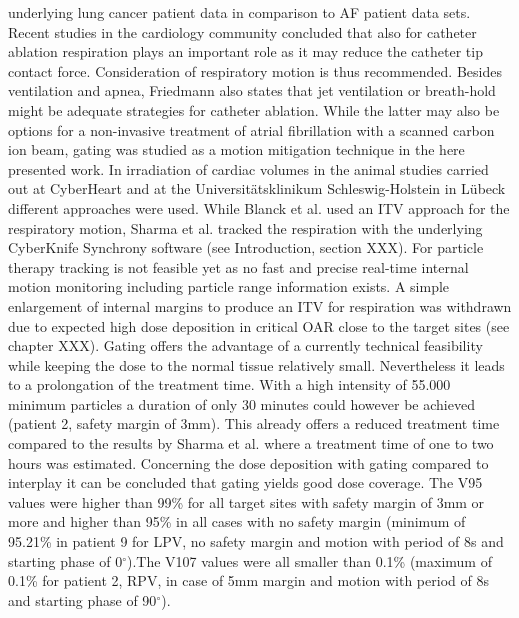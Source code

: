 \documentclass[type=dr, dr=rernat, accentcolor=tud7b,colorbacktitle, bigchapter, openright, twoside, 12pt ]{tudthesis}
\begin{document}
underlying lung cancer patient data in comparison to AF patient data sets.\newline
\newline
Recent studies in the cardiology community \cite{Kum12} concluded that also for catheter ablation respiration plays an important role as it may 
reduce the catheter tip contact force. Consideration of respiratory motion is thus recommended. Besides ventilation and apnea, Friedmann 
\cite{Frie12} also states that jet ventilation or breath-hold might be adequate strategies for catheter ablation. While the latter may also 
be options for a non-invasive treatment of atrial fibrillation with a scanned carbon ion beam, gating was 
studied as a motion mitigation technique in the here presented work. In irradiation of cardiac volumes in the animal studies carried out 
at CyberHeart and at the Universit\"atsklinikum Schleswig-Holstein in L\"ubeck different approaches were used. While Blanck et al. 
\cite{Bla13} used an ITV approach for the respiratory motion, Sharma et al. \cite{Sha10} tracked the respiration with the underlying 
CyberKnife Synchrony software (see Introduction, section XXX). For particle therapy tracking is not feasible yet as no fast and precise 
real-time internal motion monitoring including particle range information exists. A simple enlargement of internal margins to produce 
an ITV for respiration was withdrawn due to expected high dose deposition in critical OAR close to the target sites (see chapter XXX). 
Gating offers the advantage of a currently technical feasibility while keeping the dose to the normal tissue relatively small. Nevertheless 
it leads to a prolongation of the treatment time. With a high intensity of 55.000 minimum particles  a duration of only 30 minutes could 
however be achieved (patient 2, safety margin of 3mm). This 
already offers a reduced treatment time compared to the results by Sharma et al. where a treatment time of one to two hours was estimated.\newline
\newline
Concerning the dose deposition with gating compared to interplay it can be concluded that gating yields good dose coverage. The V95 values 
were higher than 99\% for all target sites with safety margin of 3mm or more and higher than 95\% in all cases with no safety margin (minimum of 
95.21\% in patient 9 for LPV, no safety margin and motion with period of 8s and starting phase of 0$^{\circ}$).The V107 values were all smaller 
than 0.1\% (maximum of 0.1\% for patient 2, RPV, in case of 5mm margin and motion with period of 8s and starting phase of 90$^{\circ}$). 
\end{document}
